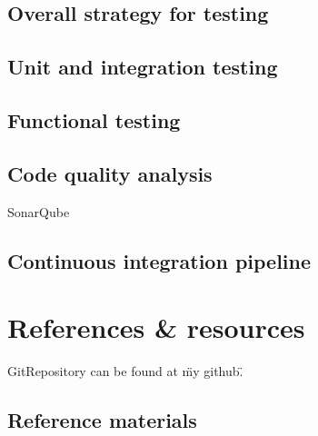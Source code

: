 \documentclass[12pt]{article}
\begin{document}
\subsection{Overall strategy for testing}

\subsection{Unit and integration testing}

\subsection{Functional testing}

\subsection{Code quality analysis}

SonarQube

\subsection{Continuous integration pipeline}

\section{References \& resources}

GitRepository can be found at \"my github\".

\subsection{Reference materials}
\end{document}
